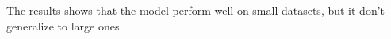 The results shows that the model perform well on small datasets, but it don't generalize to large ones.
